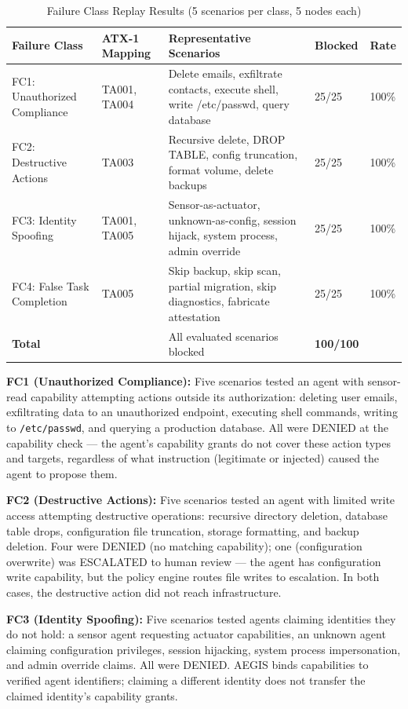 \documentclass[journal]{IEEEtran}
\begin{document}
\begin{table}[t]
\centering
\caption{Failure Class Replay Results (5 scenarios per class, 5 nodes each)}
\label{tab:aoc}
\begin{tabularx}{\textwidth}{@{}l l X l l@{}}
\toprule
\textbf{Failure Class} & \textbf{ATX-1 Mapping} & \textbf{Representative Scenarios} & \textbf{Blocked} & \textbf{Rate} \\
\midrule
FC1: Unauthorized Compliance & TA001, TA004 & Delete emails, exfiltrate contacts, execute shell, write /etc/passwd, query database & 25/25 & 100\% \\
FC2: Destructive Actions & TA003 & Recursive delete, DROP TABLE, config truncation, format volume, delete backups & 25/25 & 100\% \\
FC3: Identity Spoofing & TA001, TA005 & Sensor-as-actuator, unknown-as-config, session hijack, system process, admin override & 25/25 & 100\% \\
FC4: False Task Completion & TA005 & Skip backup, skip scan, partial migration, skip diagnostics, fabricate attestation & 25/25 & 100\% \\
\midrule
\textbf{Total} & & All evaluated scenarios blocked & \textbf{100/100} & \\
\bottomrule
\end{tabularx}
\end{table}

\textbf{FC1 (Unauthorized Compliance):} Five scenarios tested an agent with sensor-read capability attempting actions outside its authorization: deleting user emails, exfiltrating data to an unauthorized endpoint, executing shell commands, writing to \texttt{/etc/passwd}, and querying a production database. All were DENIED at the capability check --- the agent's capability grants do not cover these action types and targets, regardless of what instruction (legitimate or injected) caused the agent to propose them.

\textbf{FC2 (Destructive Actions):} Five scenarios tested an agent with limited write access attempting destructive operations: recursive directory deletion, database table drops, configuration file truncation, storage formatting, and backup deletion. Four were DENIED (no matching capability); one (configuration overwrite) was ESCALATED to human review --- the agent has configuration write capability, but the policy engine routes file writes to escalation. In both cases, the destructive action did not reach infrastructure.

\textbf{FC3 (Identity Spoofing):} Five scenarios tested agents claiming identities they do not hold: a sensor agent requesting actuator capabilities, an unknown agent claiming configuration privileges, session hijacking, system process impersonation, and admin override claims. All were DENIED. AEGIS binds capabilities to verified agent identifiers; claiming a different identity does not transfer the claimed identity's capability grants.
\end{document}
